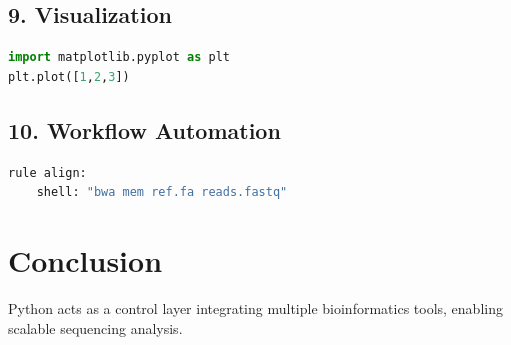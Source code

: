 \documentclass[12pt]{article}
\begin{document}
\subsection{9. Visualization}
\begin{lstlisting}[language=Python]
import matplotlib.pyplot as plt
plt.plot([1,2,3])
\end{lstlisting}

\subsection{10. Workflow Automation}
\begin{lstlisting}[language=Python]
rule align:
    shell: "bwa mem ref.fa reads.fastq"
\end{lstlisting}

\section{Conclusion}
Python acts as a control layer integrating multiple bioinformatics tools, enabling scalable sequencing analysis.
\end{document}
